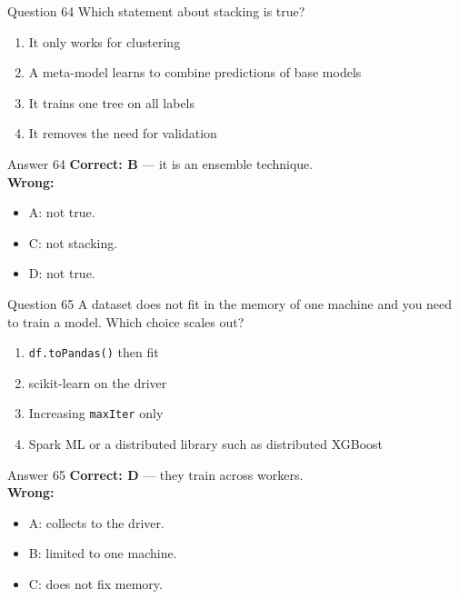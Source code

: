 \documentclass[aspectratio=169,11pt]{beamer}
\begin{document}
\begin{frame}{Question 64}
Which statement about stacking is true?
\begin{enumerate}[label=\Alph*.]
\item It only works for clustering
\item A meta-model learns to combine predictions of base models
\item It trains one tree on all labels
\item It removes the need for validation
\end{enumerate}
\end{frame}
\begin{frame}{Answer 64}
\textbf{Correct: B} --- it is an ensemble technique.\\
\vspace{0.5em}
\textbf{Wrong:}
\begin{itemize}
\item A: not true.
\item C: not stacking.
\item D: not true.
\end{itemize}
\end{frame}

\begin{frame}{Question 65}
A dataset does not fit in the memory of one machine and you need to train a model. Which choice scales out?
\begin{enumerate}[label=\Alph*.]
\item \texttt{df.toPandas()} then fit
\item scikit-learn on the driver
\item Increasing \texttt{maxIter} only
\item Spark ML or a distributed library such as distributed XGBoost
\end{enumerate}
\end{frame}
\begin{frame}{Answer 65}
\textbf{Correct: D} --- they train across workers.\\
\vspace{0.5em}
\textbf{Wrong:}
\begin{itemize}
\item A: collects to the driver.
\item B: limited to one machine.
\item C: does not fix memory.
\end{itemize}
\end{frame}
\end{document}
